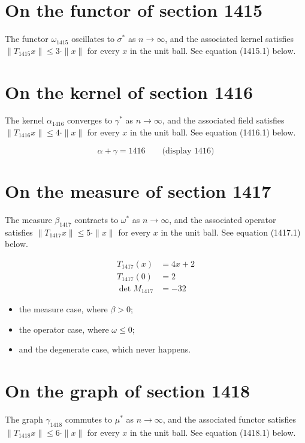 \documentclass{article}
\begin{document}
\section{On the functor of section 1415}
The functor $\omega_{1415}$ oscillates to $\sigma^{*}$ as $n \to \infty$,
and the associated kernel satisfies $\|T_{1415} x\| \leq 3 \cdot \|x\|$
for every $x$ in the unit ball. See equation (1415.1) below.

\section{On the kernel of section 1416}
The kernel $\alpha_{1416}$ converges to $\gamma^{*}$ as $n \to \infty$,
and the associated field satisfies $\|T_{1416} x\| \leq 4 \cdot \|x\|$
for every $x$ in the unit ball. See equation (1416.1) below.

$$
\alpha + \gamma = 1416 \qquad \text{(display 1416)}
$$

\section{On the measure of section 1417}
The measure $\beta_{1417}$ contracts to $\omega^{*}$ as $n \to \infty$,
and the associated operator satisfies $\|T_{1417} x\| \leq 5 \cdot \|x\|$
for every $x$ in the unit ball. See equation (1417.1) below.

\begin{align}
T_{1417}(x) &= 4 x + 2 \\
T_{1417}(0) &= 2 \\
\det M_{1417} &= -32
\end{align}

\begin{itemize}
  \item the measure case, where $\beta > 0$;
  \item the operator case, where $\omega \leq 0$;
  \item and the degenerate case, which never happens.
\end{itemize}

\section{On the graph of section 1418}
The graph $\gamma_{1418}$ commutes to $\mu^{*}$ as $n \to \infty$,
and the associated functor satisfies $\|T_{1418} x\| \leq 6 \cdot \|x\|$
for every $x$ in the unit ball. See equation (1418.1) below.
\end{document}
